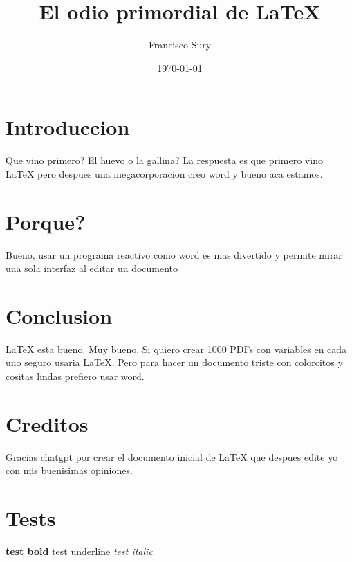 \documentclass{article}
\title{El odio primordial de LaTeX}
\author{Francisco Sury}
\date{\today}
\begin{document}
\maketitle

\section{Introduccion}

Que vino primero? El huevo o la gallina? La respuesta es que primero vino LaTeX pero despues una megacorporacion creo word y bueno aca estamos.

\section{Porque?}

Bueno, usar un programa reactivo como word es mas divertido y permite mirar una sola interfaz al editar un documento

\section{Conclusion}

LaTeX esta bueno. Muy bueno. Si quiero crear 1000 PDFs con variables en cada uno seguro usaria LaTeX. Pero para hacer un documento triste con colorcitos y cositas lindas prefiero usar word.

\section{Creditos}

Gracias chatgpt por crear el documento inicial de LaTeX que despues edite yo con mis buenisimas opiniones.

\section{Tests}

\textbf{test bold}
\underline{test underline}
\textit{test italic} 
\end{document}
